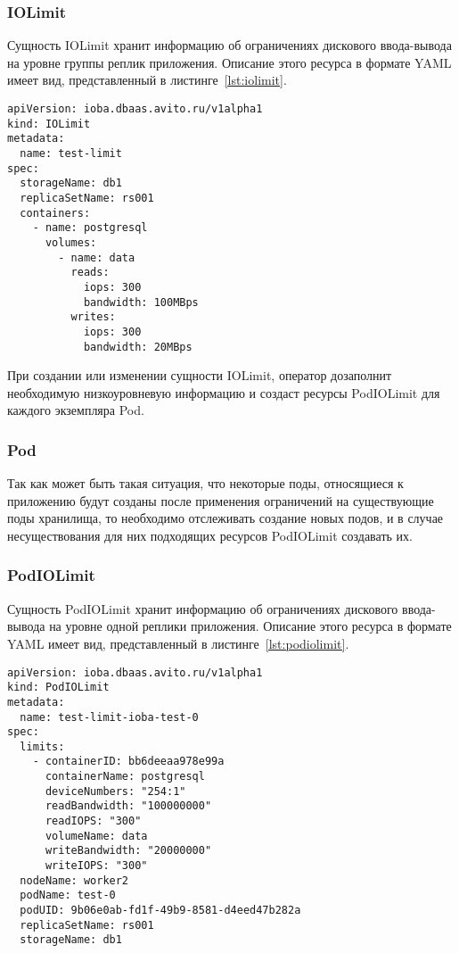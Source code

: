 \subsubsection{IOLimit}

Сущность IOLimit хранит информацию об ограничениях дискового ввода-вывода на уровне группы реплик приложения. Описание этого ресурса в формате YAML имеет вид, представленный в листинге~\ref{lst:iolimit}.

\begin{lstlisting}[label=lst:iolimit, caption={Пример описания сущности IOLimit в формате YAML}]
apiVersion: ioba.dbaas.avito.ru/v1alpha1
kind: IOLimit
metadata:
  name: test-limit
spec:
  storageName: db1
  replicaSetName: rs001
  containers:
    - name: postgresql
      volumes:
        - name: data
          reads:
            iops: 300
            bandwidth: 100MBps
          writes:
            iops: 300
            bandwidth: 20MBps
\end{lstlisting}

При создании или изменении сущности IOLimit, оператор дозаполнит необходимую низкоуровневую информацию и создаст ресурсы PodIOLimit для каждого экземпляра Pod.      

\subsubsection{Pod}

Так как может быть такая ситуация, что некоторые поды, относящиеся к приложению будут созданы после применения ограничений на существующие поды хранилища, то необходимо отслеживать создание новых подов, и в случае несуществования для них подходящих ресурсов PodIOLimit создавать их.

\subsubsection{PodIOLimit}

Сущность PodIOLimit хранит информацию об ограничениях дискового ввода-вывода на уровне одной реплики приложения. Описание этого ресурса в формате YAML имеет вид, представленный в листинге~\ref{lst:podiolimit}.

\begin{lstlisting}[label=lst:podiolimit, caption={Пример описания сущности PodIOLimit в формате YAML}]
apiVersion: ioba.dbaas.avito.ru/v1alpha1
kind: PodIOLimit
metadata:
  name: test-limit-ioba-test-0
spec:
  limits:
    - containerID: bb6deeaa978e99a
      containerName: postgresql
      deviceNumbers: "254:1"
      readBandwidth: "100000000"
      readIOPS: "300"
      volumeName: data
      writeBandwidth: "20000000"
      writeIOPS: "300"
  nodeName: worker2
  podName: test-0
  podUID: 9b06e0ab-fd1f-49b9-8581-d4eed47b282a
  replicaSetName: rs001
  storageName: db1
\end{lstlisting}

